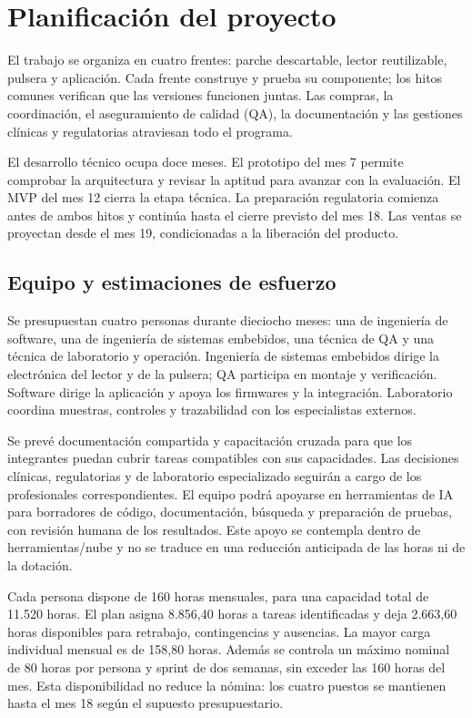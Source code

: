 \clearpage
\section{Planificación del proyecto}\label{sec:planificacion}
El trabajo se organiza en cuatro frentes: parche descartable, lector reutilizable, pulsera y aplicación. Cada frente construye y prueba su componente; los hitos comunes verifican que las versiones funcionen juntas. Las compras, la coordinación, el aseguramiento de calidad (QA), la documentación y las gestiones clínicas y regulatorias atraviesan todo el programa.

El desarrollo técnico ocupa doce meses. El prototipo del mes 7 permite comprobar la arquitectura y revisar la aptitud para avanzar con la evaluación. El MVP del mes 12 cierra la etapa técnica. La preparación regulatoria comienza antes de ambos hitos y continúa hasta el cierre previsto del mes 18. Las ventas se proyectan desde el mes 19, condicionadas a la liberación del producto.

\subsection{Equipo y estimaciones de esfuerzo}
Se presupuestan cuatro personas durante dieciocho meses: una de ingeniería de software, una de ingeniería de sistemas embebidos, una técnica de QA y una técnica de laboratorio y operación. Ingeniería de sistemas embebidos dirige la electrónica del lector y de la pulsera; QA participa en montaje y verificación. Software dirige la aplicación y apoya los firmwares y la integración. Laboratorio coordina muestras, controles y trazabilidad con los especialistas externos.

Se prevé documentación compartida y capacitación cruzada para que los integrantes puedan cubrir tareas compatibles con sus capacidades. Las decisiones clínicas, regulatorias y de laboratorio especializado seguirán a cargo de los profesionales correspondientes. El equipo podrá apoyarse en herramientas de IA para borradores de código, documentación, búsqueda y preparación de pruebas, con revisión humana de los resultados. Este apoyo se contempla dentro de herramientas/nube y no se traduce en una reducción anticipada de las horas ni de la dotación.

Cada persona dispone de 160 horas mensuales, para una capacidad total de 11.520 horas. El plan asigna 8.856,40 horas a tareas identificadas y deja 2.663,60 horas disponibles para retrabajo, contingencias y ausencias. La mayor carga individual mensual es de 158,80 horas. Además se controla un máximo nominal de 80 horas por persona y sprint de dos semanas, sin exceder las 160 horas del mes. Esta disponibilidad no reduce la nómina: los cuatro puestos se mantienen hasta el mes 18 según el supuesto presupuestario.

